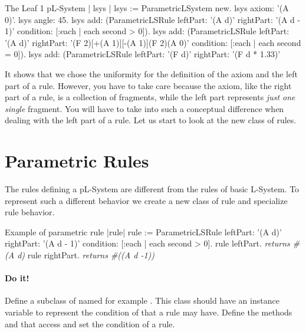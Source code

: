 \begin{scriptwithtitle}{The Leaf 1 pL-System}\label{scr:paramlsystdef}
| lsys |
lsys := ParametricLSystem new.
lsys axiom: '(A 0)'.
lsys angle: 45.
lsys add: (ParametricLSRule 
             leftPart: '(A d)'
             rightPart: '(A d - 1)'
             condition: [:each | each second > 0]).
lsys add: (ParametricLSRule
             leftPart: '(A d)'
             rightPart: '(F 2)[+(A 1)][-(A 1)](F 2)(A 0)'
             condition: [:each | each second = 0]).
lsys add: (ParametricLSRule
             leftPart: '(F d)'
             rightPart: '(F d * 1.33)'
\end{scriptwithtitle}


It shows that we chose the uniformity for the definition of the axiom
and the left part of a rule. However, you have to take care because
the axiom, like the right part of a rule, is a collection of
fragments, while the left part represents \emph{just one single}
fragment.  You will have to take into such a conceptual difference when
dealing with the left part of a rule. Let us start to look at the new
class of rules.


\section{Parametric Rules}
The rules defining a pL-System are different from the rules of basic
L-System.  To represent such a different behavior we create a new
class of rule and specialize rule behavior. 

\begin{scriptwithtitle}{Example of parametric rule}\label{scr:paramruledef}
|rule|
rule := ParametricLSRule 
   	  leftPart: '(A d)'
          rightPart: '(A d - 1)'
          condition: [:each | each second  > 0].
rule leftPart.
\emph{returns #(A d)}
rule rightPart.
\emph{returns #((A d -1))}
\end{scriptwithtitle}



\paragraph{Do it!}
Define a subclass of  named for example
. This class should have an instance variable 
to represent the condition of that a rule may have.  Define the
methods  and  that access and set the
condition of a rule.

